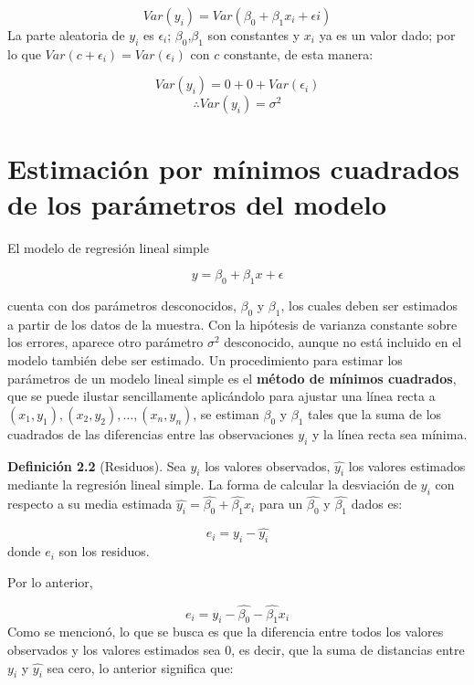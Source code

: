 \documentclass[
  a4paper,
  oneside,
  openany]{book}
\begin{document}
\[Var(y_{i})= Var(\beta_{0}+\beta_{1}x_{i}+\epsilon{i})\]
La parte aleatoria de \(y_{i}\) es \(\epsilon_{i}\); \(\beta_{0}\),\(\beta_{1}\) son constantes y \(x_{i}\) ya es un valor dado; por lo que \(Var(c+\epsilon_{i})=Var(\epsilon_{i})\) con \(c\) constante, de esta manera:

\[Var(y_{i})=0+0+Var(\epsilon_{i})\]
\[\therefore Var(y_{i})=\sigma^2\]

\hypertarget{estimaciuxf3n-por-muxednimos-cuadrados-de-los-paruxe1metros-del-modelo}{%
\section{Estimación por mínimos cuadrados de los parámetros del modelo}\label{estimaciuxf3n-por-muxednimos-cuadrados-de-los-paruxe1metros-del-modelo}}

El modelo de regresión lineal simple

\[y=\beta_{0}+\beta_{1}x+\epsilon\]

cuenta con dos parámetros desconocidos, \(\beta_{0}\) y \(\beta_{1}\), los cuales deben ser estimados a partir de los datos de la muestra. Con la hipótesis de varianza constante sobre los errores, aparece otro parámetro \(\sigma^2\) desconocido, aunque no está incluido en el modelo también debe ser estimado.
Un procedimiento para estimar los parámetros de un modelo lineal simple es el \textbf{método de mínimos cuadrados}, que se puede ilustar sencillamente aplicándolo para ajustar una línea recta a \((x_{1},y_{1}),(x_{2},y_{2}),\ldots,(x_{n},y_{n})\), se estiman \(\beta_{0}\) y \(\beta_{1}\) tales que la suma de los cuadrados de las diferencias entre las observaciones \(y_{i}\) y la línea recta sea mínima.

\textbf{Definición 2.2} (Residuos). Sea \(y_{i}\) los valores observados, \(\hat{y_{i}}\) los valores estimados mediante la regresión lineal simple. La forma de calcular la desviación de \(y_{i}\) con respecto a su media estimada \(\hat{y_{i}}=\hat{\beta_{0}}+\hat{\beta_{1}}x_{i}\) para un \(\hat{\beta_{0}}\) y \(\hat{\beta_{1}}\) dados es:

\[e_{i}=y_{i}-\hat{y_{i}}\]
donde \(e_{i}\) son los residuos.

Por lo anterior,

\[e_{i}=y_{i}-\hat{\beta_{0}}-\hat{\beta_{1}}x_{i}\]
Como se mencionó, lo que se busca es que la diferencia entre todos los valores observados y los valores estimados sea 0, es decir, que la suma de distancias entre \(y_{i}\) y \(\hat{y_{i}}\) sea cero, lo anterior significa que:
\end{document}

